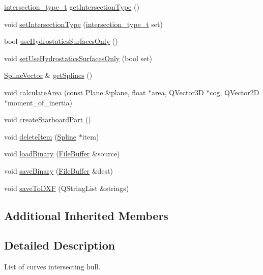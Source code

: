 \begin{DoxyCompactItemize}
\item 
\hyperlink{namespaceShipCAD_aa56834b730aafdf2786ddc9a60a046fd}{intersection\-\_\-type\-\_\-t} \hyperlink{classShipCAD_1_1Intersection_a1b93db56e5877226b30871754bba9838}{get\-Intersection\-Type} ()
\item 
void \hyperlink{classShipCAD_1_1Intersection_adc12c68675b19f5ae92d4c6ec8db0f62}{set\-Intersection\-Type} (\hyperlink{namespaceShipCAD_aa56834b730aafdf2786ddc9a60a046fd}{intersection\-\_\-type\-\_\-t} set)
\item 
bool \hyperlink{classShipCAD_1_1Intersection_a5ac5f3018d8b95b57ab40ccafe782bf4}{use\-Hydrostatics\-Surfaces\-Only} ()
\item 
void \hyperlink{classShipCAD_1_1Intersection_a8b587bbe80ef146d25e8a1568a84afb0}{set\-Use\-Hydrostatics\-Surfaces\-Only} (bool set)
\item 
\hyperlink{namespaceShipCAD_a053b941b2c87049bb9380428d4d5a056}{Spline\-Vector} \& \hyperlink{classShipCAD_1_1Intersection_a0092acbb149bb6a5c2e1f9a4b300c2da}{get\-Splines} ()
\item 
void \hyperlink{classShipCAD_1_1Intersection_ade472c721a5cb093c0b464c770c88634}{calculate\-Area} (const \hyperlink{classShipCAD_1_1Plane}{Plane} \&plane, float $\ast$area, Q\-Vector3\-D $\ast$cog, Q\-Vector2\-D $\ast$moment\-\_\-of\-\_\-inertia)
\item 
void \hyperlink{classShipCAD_1_1Intersection_a0af2af543403b3c69d1d3c786a1c6575}{create\-Starboard\-Part} ()
\item 
void \hyperlink{classShipCAD_1_1Intersection_ada420a69dc8141794aa617f966cbe2b2}{delete\-Item} (\hyperlink{classShipCAD_1_1Spline}{Spline} $\ast$item)
\item 
void \hyperlink{classShipCAD_1_1Intersection_a3e87aa28a1e1d721fe657a73d5466f3b}{load\-Binary} (\hyperlink{classShipCAD_1_1FileBuffer}{File\-Buffer} \&source)
\item 
void \hyperlink{classShipCAD_1_1Intersection_a41ce3a17845a7808d052713ae57dbe63}{save\-Binary} (\hyperlink{classShipCAD_1_1FileBuffer}{File\-Buffer} \&dest)
\item 
void \hyperlink{classShipCAD_1_1Intersection_a00a6d7ad7e82e43bd0287fa88dd87cf3}{save\-To\-D\-X\-F} (Q\-String\-List \&strings)
\end{DoxyCompactItemize}
\subsection*{Additional Inherited Members}


\subsection{Detailed Description}
List of curves intersecting hull. 

